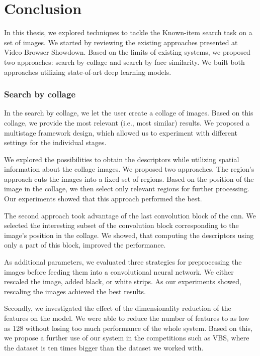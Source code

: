\chapter*{Conclusion}

In this thesis, we explored techniques to tackle the Known-item search task on a set of images. We started by reviewing the existing approaches presented at Video Browser Showdown. Based on the limits of existing systems, we proposed two approaches: search by collage and search by face similarity. We built both approaches utilizing state-of-art deep learning models. 

\subsection*{Search by collage}

In the search by collage, we let the user create a collage of images. Based on this collage, we provide the most relevant (i.e., most similar) results. We proposed a multistage framework design, which allowed us to experiment with different settings for the individual stages.

We explored the possibilities to obtain the descriptors while utilizing spatial information about the collage images. We proposed two approaches. The region's approach cuts the images into a fixed set of regions. Based on the position of the image in the collage, we then select only relevant regions for further processing. Our experiments showed that this approach performed the best. 

The second approach took advantage of the last convolution block of the \acrshort{cnn}. We selected the interesting subset of the convolution block corresponding to the image's position in the collage. We showed, that computing the descriptors using only a part of this block, improved the performance. 

As additional parameters, we evaluated three strategies for preprocessing the images before feeding them into a convolutional neural network. We either rescaled the image, added black, or white strips. As our experiments showed, rescaling the images achieved the best results.

Secondly, we investigated the effect of the dimensionality reduction of the features on the model. We were able to reduce the number of features to as low as 128 without losing too much performance of the whole system. Based on this, we propose a further use of our system in the competitions such as VBS, where the dataset is ten times bigger than the dataset we worked with.

